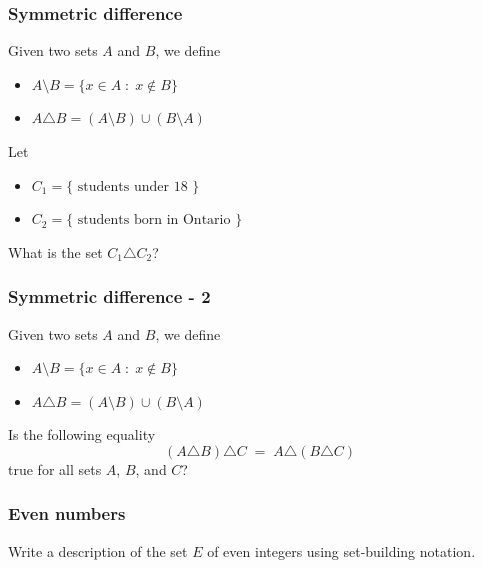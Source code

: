 \begin{frame}
	\frametitle{Symmetric difference}

	Given two sets $A$ and $B$, we define
	\begin{itemize}
		\item $A \setminus B = \{ x \in A \; : \; x \notin B \}$

		\item $A \triangle B = (A \setminus B) \cup (B \setminus A)$
	\end{itemize}

	\vfill

	Let
	\begin{itemize}
		\item $C_{1}= \{ \text{ students under 18 }\}$

		\item $C_{2}= \{ \text{ students born in Ontario }\}$
	\end{itemize}

	\vfill

	What is the set $C_{1}\triangle C_{2}$?

	\vfill
\end{frame}

\begin{frame}
	\frametitle{Symmetric difference - 2}

	Given two sets $A$ and $B$, we define
	\begin{itemize}
		\item $A \setminus B = \{ x \in A \; : \; x \notin B \}$

		\item $A \triangle B = (A \setminus B) \cup (B \setminus A)$
	\end{itemize}

	\vfill

	Is the following equality
	\[
		(A \triangle B) \triangle C \; = \; A \triangle (B \triangle C)
	\]
	true for all sets $A$, $B$, and $C$?

	\vfill
\end{frame}

\begin{frame}[t]
	\frametitle{Even numbers}

	Write a description of the set $E$ of even integers using set-building
	notation.
\end{frame}

